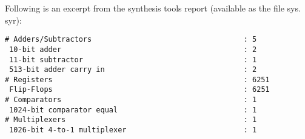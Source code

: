 Following is an excerpt from the synthesis tools report (available as the file sys.
syr):

\begin{verbatim}
# Adders/Subtractors                                   : 5
 10-bit adder                                          : 2
 11-bit subtractor                                     : 1
 513-bit adder carry in                                : 2
# Registers                                            : 6251
 Flip-Flops                                            : 6251
# Comparators                                          : 1
 1024-bit comparator equal                             : 1
# Multiplexers                                         : 1
 1026-bit 4-to-1 multiplexer                           : 1
\end{verbatim}

